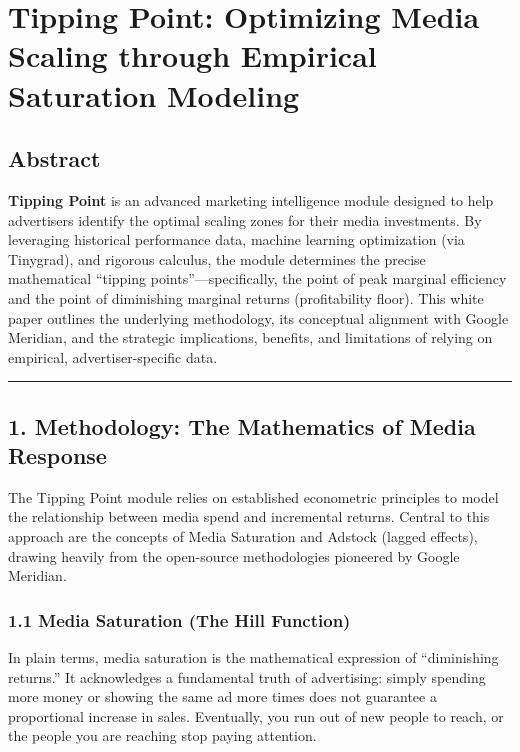 \documentclass[
]{article}
\author{}
\date{}
\begin{document}
\section{Tipping Point: Optimizing Media Scaling through Empirical
Saturation
Modeling}\label{tipping-point-optimizing-media-scaling-through-empirical-saturation-modeling}

\subsection{Abstract}\label{abstract}

\textbf{Tipping Point} is an advanced marketing intelligence module
designed to help advertisers identify the optimal scaling zones for
their media investments. By leveraging historical performance data,
machine learning optimization (via Tinygrad), and rigorous calculus, the
module determines the precise mathematical ``tipping
points''---specifically, the point of peak marginal efficiency and the
point of diminishing marginal returns (profitability floor). This white
paper outlines the underlying methodology, its conceptual alignment with
Google Meridian, and the strategic implications, benefits, and
limitations of relying on empirical, advertiser-specific data.

\begin{center}\rule{0.5\linewidth}{0.5pt}\end{center}

\subsection{1. Methodology: The Mathematics of Media
Response}\label{methodology-the-mathematics-of-media-response}

The Tipping Point module relies on established econometric principles to
model the relationship between media spend and incremental returns.
Central to this approach are the concepts of Media Saturation and
Adstock (lagged effects), drawing heavily from the open-source
methodologies pioneered by Google Meridian.

\subsubsection{1.1 Media Saturation (The Hill
Function)}\label{media-saturation-the-hill-function}

In plain terms, media saturation is the mathematical expression of
``diminishing returns.'' It acknowledges a fundamental truth of
advertising: simply spending more money or showing the same ad more
times does not guarantee a proportional increase in sales. Eventually,
you run out of new people to reach, or the people you are reaching stop
paying attention.
\end{document}
